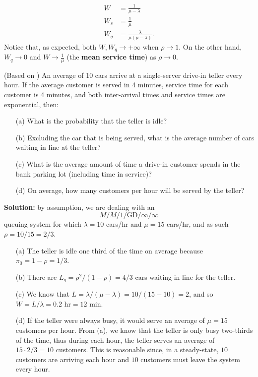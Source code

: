 \begin{align*}
W &= \frac{1}{\mu - \lambda}\\
W_{s} &= \frac{1}{\mu}\\
W_{q} &= \frac{\lambda}{\mu(\mu-\lambda)}.
 \end{align*}
Notice that, as expected, both $W,W_q\to +\infty$ when $\rho\to 1$. On the other hand, $W_{q}\to 0$ and $W\to \frac{1}{\mu}$ (the \textbf{mean service time}) as $\rho\to 0$.
\begin{Example} (Based on \cite{QS_W}) An average of 10 cars arrive at a single-server drive-in teller every hour. If the average customer is served in 4 minutes, service time for each customer is 4 minutes, and both inter-arrival times and service times are exponential, then: \begin{itemize}[noitemsep]
	\item[(a)] What is the probability that the teller is idle? 
	\item[(b)] Excluding the car that is being served, what is the average number of cars waiting in line at the teller? 
	\item[(c)] What is the average amount of time a drive-in customer spends in the bank parking lot (including time in service)?
	\item[(d)] On average, how many customers per hour will be served by the teller?
\end{itemize}
\textbf{Solution:} by assumption, we are dealing with an $$M/M/1/\textrm{GD}/\infty/\infty$$ queuing system for which $\lambda = 10$ cars/hr and $\mu = 15$ cars/hr, and as such  $\rho = 10/15 = 2/3$.
\begin{itemize}[noitemsep]
	\item[(a)] The teller is idle one third of the time on average because $\pi_{0} = 1 - \rho = 1/3$.
	\item[(b)] There are $L_{q} = \rho^{2}/(1-\rho) = 4/3$ cars waiting in line for the teller. 
	\item[(c)] We know that $L = \lambda/(\mu - \lambda) = 10/(15-10) = 2$, and so $W = L/\lambda = 0.2 \textrm{ hr} = 12 \textrm{ min}$.
	\item[(d)] If the teller were always busy, it would serve an average of $\mu = 15$ customers per hour. From (a), we know that the teller is only busy two-thirds of the time, thus during each hour, the teller serves an average of $15 \cdot 2/3 = 10$ customers. This is reasonable since, in a steady-state, $10$ customers are arriving each hour and $10$ customers must leave the system every hour.
\end{itemize}
\end{Example}
